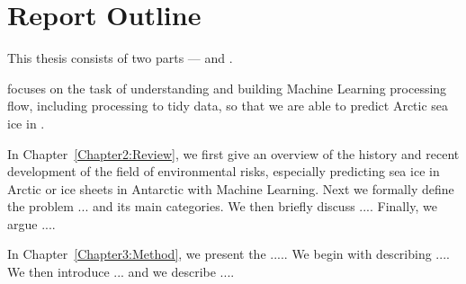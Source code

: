 \section{Report Outline} %

This thesis consists of two parts ---  and .

 focuses on the task of understanding and building Machine Learning processing flow, including processing to tidy data, so that we are able to predict Arctic sea ice in .

\begin{description}
    \item In Chapter~\ref{Chapter2:Review}, we first give an overview of the history and recent development of the field of environmental risks, especially predicting sea ice in Arctic or ice sheets in Antarctic with Machine Learning. Next we formally define the problem ... and its main categories. We then briefly discuss ....  Finally, we argue ....
    \item In Chapter~\ref{Chapter3:Method}, we present the ..... We begin with describing .... We then introduce ... and we describe .... 
   
\end{description}